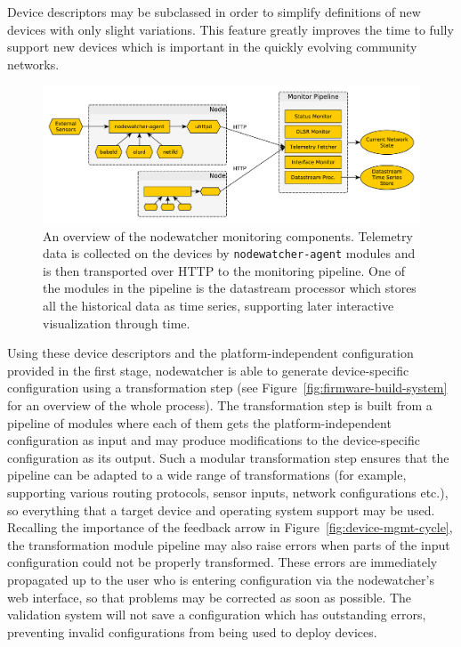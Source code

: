 \documentclass[5p,sort&compress]{elsarticle}
\begin{document}
Device descriptors may be subclassed in order to simplify definitions of new devices with only slight variations.
This feature greatly improves the time to fully support new devices which is important in the quickly evolving community networks.

\begin{figure}
  \centering
  \includegraphics[scale=0.5]{figures/monitoring-pipeline.pdf}
  \caption{An overview of the nodewatcher monitoring components. Telemetry data is collected on the devices by \texttt{nodewatcher-agent} modules and is then transported over HTTP to the monitoring pipeline. One of the modules in the pipeline is the datastream processor which stores all the historical data as time series, supporting later interactive visualization through time.}
  \label{fig:monitoring-pipeline}
\end{figure}

Using these device descriptors and the platform-independent configuration provided in the first stage, nodewatcher is able to generate device-specific configuration using a transformation step (see Figure~\ref{fig:firmware-build-system} for an overview of the whole process).
The transformation step is built from a pipeline of modules where each of them gets the platform-independent configuration as input and may produce modifications to the device-specific configuration as its output.
Such a modular transformation step ensures that the pipeline can be adapted to a wide range of transformations (for example, supporting various routing protocols, sensor inputs, network configurations etc.), so everything that a target device and operating system support may be used.
Recalling the importance of the feedback arrow in Figure~\ref{fig:device-mgmt-cycle}, the transformation module pipeline may also raise errors when parts of the input configuration could not be properly transformed.
These errors are immediately propagated up to the user who is entering configuration via the nodewatcher's web interface, so that problems may be corrected as soon as possible.
The validation system will not save a configuration which has outstanding errors, preventing invalid configurations from being used to deploy devices.
\end{document}
